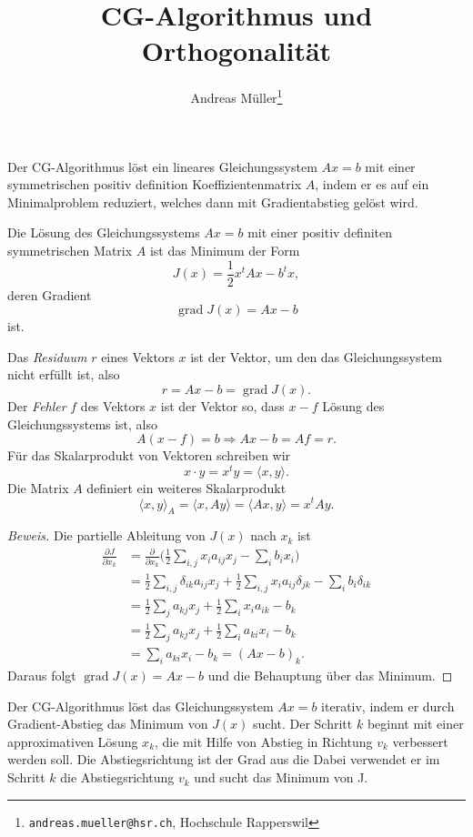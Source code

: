 \documentclass[a4paper,11pt]{article}
\title{CG-Algorithmus und Orthogonalität}
\author{
Andreas Müller\footnote{\texttt{andreas.mueller@hsr.ch},
Hochschule Rapperswil}
}
\begin{document}
\maketitle
\renewcommand{\floatpagefraction}{0.7}

Der CG-Algorithmus löst ein lineares Gleichungssystem $Ax=b$ mit
einer symmetrischen positiv definition Koeffizientenmatrix $A$, indem
er es auf ein Minimalproblem reduziert, welches dann mit Gradientabstieg
gelöst wird.

\begin{satz}
Die Lösung des Gleichungssystems $Ax=b$ mit einer positiv definiten
symmetrischen Matrix $A$ ist das Minimum der Form
\[
J(x) = \frac12 x^t Ax - b^tx,
\]
deren Gradient
\[
\operatorname{grad}J(x) = Ax-b
\]
ist.
\end{satz}

\begin{definition}
Das {\em Residuum} $r$ eines Vektors $x$ ist der Vektor, um den das
Gleichungssystem nicht erfüllt ist, also
\[
r = Ax-b = \operatorname{grad}J(x).
\]
Der {\em Fehler} $f$ des Vektors $x$ ist der Vektor so, dass
$x-f$ Lösung des Gleichungssystems ist, also
\[
A(x-f)=b
\Rightarrow
Ax-b=Af=r.
\]
Für das Skalarprodukt von Vektoren schreiben wir
\[
x\cdot y
=
x^ty
=
\langle x,y\rangle.
\]
Die Matrix $A$ definiert ein weiteres Skalarprodukt
\[
\langle x,y\rangle_A
=
\langle x,Ay\rangle
=
\langle Ax,y\rangle
=
x^tAy.
\]
\end{definition}

\begin{proof}[Beweis]
Die partielle Ableitung von $J(x)$ nach $x_k$ ist
\begin{align*}
\frac{\partial J}{\partial x_k}
&=
\frac{\partial}{\partial x_k}
\biggl(
\frac12
\sum_{i,j} x_i a_{ij} x_j - \sum_i b_i x_i
\biggr)
\\
&=
\frac12
\sum_{i,j}
\delta_{ik} a_{ij}x_j
+
\frac12
\sum_{i,j}
x_i a_{ij} \delta_{jk}
-
\sum_i b_i \delta_{ik}
\\
&=
\frac12
\sum_{j} a_{kj} x_j
+
\frac12
\sum_{i} x_i a_{ik}
-
b_k
\\
&=
\frac12
\sum_{j} a_{kj} x_j
+
\frac12
\sum_{i} a_{ki} x_i
-b_k
\\
&=
\sum_{i} a_{ki} x_i - b_k
=
(Ax-b)_k.
\end{align*}
Daraus folgt $\operatorname{grad}J(x) = Ax-b$ und die Behauptung über
das Minimum.
\end{proof}

Der CG-Algorithmus löst das Gleichungssystem $Ax=b$ iterativ, indem er
durch Gradient-Abstieg das Minimum von $J(x)$ sucht.
Der Schritt $k$ beginnt mit einer approximativen Lösung $x_k$, die mit
Hilfe von Abstieg in Richtung $v_k$ verbessert werden soll.
Die Abstiegsrichtung ist der Grad
aus die
Dabei verwendet er im Schritt $k$ die Abstiegsrichtung $v_k$ und sucht
das Minimum von J.
\end{document}
